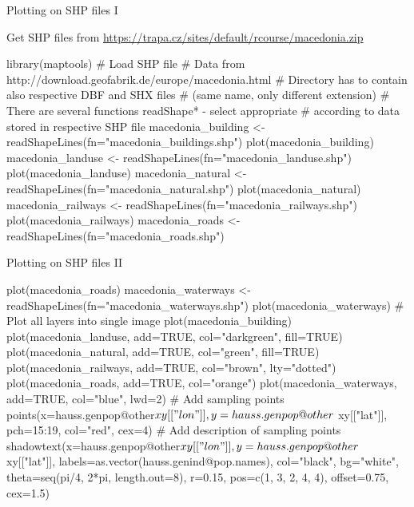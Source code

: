 \documentclass[compress, ucs, xelatex, 11pt, xcolor=svgnames,
  hyperref={
    bookmarks=true,
    unicode=true,
    colorlinks=true,
    pdftitle={Molecular data in R},
    plainpages=false,
    pdfauthor={Vojtech Zeisek},
    pdfsubject={Course about phylogeny and evolution in R},
    pdfcreator={XeLaTeX},
    pdfkeywords={R, evolution, phylogeny, molecular data},
    linkcolor=Tomato,
    anchorcolor=SaddleBrown,
    citecolor=Goldenrod,
    filecolor=DarkMagenta,
    menucolor=Sienna,
    urlcolor=DarkTurquoise,
    pdftex},
  url={hyphens, lowtilde} %
  ]{beamer}
\begin{document}
\begin{frame}[fragile]{Plotting on SHP files I}
\begin{scriptsize}
  Get SHP files from \url{https://trapa.cz/sites/default/rcourse/macedonia.zip}
\end{scriptsize}
  \begin{spluscode}
    library(maptools)
    # Load SHP file
    # Data from http://download.geofabrik.de/europe/macedonia.html
    # Directory has to contain also respective DBF and SHX files
    # (same name, only different extension)
    # There are several functions readShape* - select appropriate
    # according to data stored in respective SHP file
    macedonia_building <- readShapeLines(fn="macedonia_buildings.shp")
    plot(macedonia_building)
    macedonia_landuse <- readShapeLines(fn="macedonia_landuse.shp")
    plot(macedonia_landuse)
    macedonia_natural <- readShapeLines(fn="macedonia_natural.shp")
    plot(macedonia_natural)
    macedonia_railways <- readShapeLines(fn="macedonia_railways.shp")
    plot(macedonia_railways)
    macedonia_roads <- readShapeLines(fn="macedonia_roads.shp")
  \end{spluscode}
\end{frame}

\begin{frame}[fragile]{Plotting on SHP files II}
  \begin{spluscode}
    plot(macedonia_roads)
    macedonia_waterways <- readShapeLines(fn="macedonia_waterways.shp")
    plot(macedonia_waterways)
    # Plot all layers into single image
    plot(macedonia_building)
    plot(macedonia_landuse, add=TRUE, col="darkgreen", fill=TRUE)
    plot(macedonia_natural, add=TRUE, col="green", fill=TRUE)
    plot(macedonia_railways, add=TRUE, col="brown", lty="dotted")
    plot(macedonia_roads, add=TRUE, col="orange")
    plot(macedonia_waterways, add=TRUE, col="blue", lwd=2)
    # Add sampling points
    points(x=hauss.genpop@other$xy[["lon"]], y=hauss.genpop@other$
      xy[["lat"]], pch=15:19, col="red", cex=4)
    # Add description of sampling points
    shadowtext(x=hauss.genpop@other$xy[["lon"]], y=hauss.genpop@other$
      xy[["lat"]], labels=as.vector(hauss.genind@pop.names), col="black",
      bg="white", theta=seq(pi/4, 2*pi, length.out=8), r=0.15,
      pos=c(1, 3, 2, 4, 4), offset=0.75, cex=1.5)
  \end{spluscode}
\end{frame}
\end{document}
